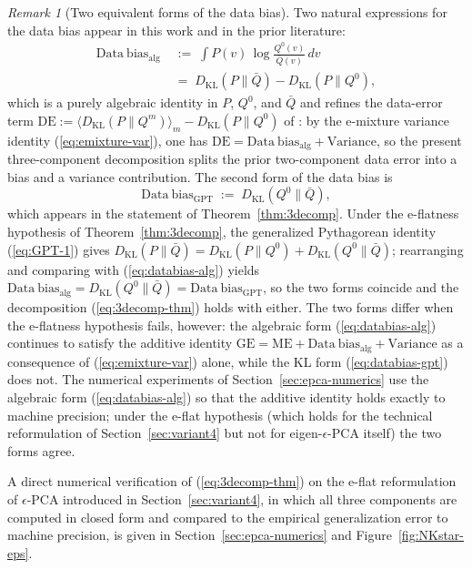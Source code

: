 \documentclass[11pt,a4paper]{article}
\theoremstyle{definition}
\theoremstyle{remark}
\newtheorem*{remark}{Remark}
\newcommand{\KL}{D_{\mathrm{KL}}}
\newcommand{\PV}{P}
\newcommand{\QVz}{Q^{0}}
\newcommand{\QVm}{Q^{m}}
\newcommand{\QVbar}{\bar{Q}}
\begin{document}
\begin{remark}[Two equivalent forms of the data bias]
\label{rem:two-forms}
Two natural expressions for the data bias appear in this work and
in the prior literature:
\begin{align}
  \mathrm{Data\ bias}_{\text{alg}}
  &\;:=\;
  \int \PV(v)\,\log\frac{\QVz(v)}{\QVbar(v)}\,dv
  \nonumber \\
  &\;=\;
  \KL(\PV\|\QVbar) - \KL(\PV\|\QVz),
  \label{eq:databias-alg}
\end{align}
which is a purely algebraic identity in $\PV$, $\QVz$, and
$\QVbar$ and refines the data-error term $\mathrm{DE} :=
\langle\KL(\PV\|\QVm)\rangle_{m} - \KL(\PV\|\QVz)$ of
\cite{Kim2023JSTAT}: by the e-mixture variance identity
(\ref{eq:emixture-var}), one has
$\mathrm{DE} = \mathrm{Data\ bias}_{\text{alg}} +
\mathrm{Variance}$, so the present three-component decomposition
splits the prior two-component data error into a bias and a
variance contribution. The second form of the data bias is
\begin{equation}
  \mathrm{Data\ bias}_{\text{GPT}}
  \;:=\; \KL(\QVz\|\QVbar),
  \label{eq:databias-gpt}
\end{equation}
which appears in the statement of
Theorem~\ref{thm:3decomp}. Under the e-flatness hypothesis of
Theorem~\ref{thm:3decomp}, the generalized Pythagorean identity
(\ref{eq:GPT-1}) gives $\KL(\PV\|\QVbar) = \KL(\PV\|\QVz) +
\KL(\QVz\|\QVbar)$; rearranging and comparing with
(\ref{eq:databias-alg}) yields
$\mathrm{Data\ bias}_{\text{alg}} = \KL(\QVz\|\QVbar) =
\mathrm{Data\ bias}_{\text{GPT}}$, so the two forms coincide
and the decomposition (\ref{eq:3decomp-thm}) holds with either.
The two forms differ when the e-flatness hypothesis fails, however:
the algebraic form (\ref{eq:databias-alg}) continues to satisfy the
additive identity
$\mathrm{GE} = \mathrm{ME} + \mathrm{Data\ bias}_{\text{alg}} +
\mathrm{Variance}$ as a consequence of (\ref{eq:emixture-var}) alone,
while the KL form (\ref{eq:databias-gpt}) does not. The
numerical experiments of Section~\ref{sec:epca-numerics} use
the algebraic form (\ref{eq:databias-alg}) so that the additive
identity holds exactly to machine precision; under the e-flat
hypothesis (which holds for the technical reformulation of
Section~\ref{sec:variant4} but not for eigen-$\epsilon$-PCA
itself) the two forms agree.
\end{remark}

A direct numerical verification of (\ref{eq:3decomp-thm}) on
the e-flat reformulation of $\epsilon$-PCA introduced in
Section~\ref{sec:variant4}, in which all three components are
computed in closed form and compared to the empirical
generalization error to machine precision, is given in
Section~\ref{sec:epca-numerics} and Figure~\ref{fig:NKstar-eps}.
\end{document}
